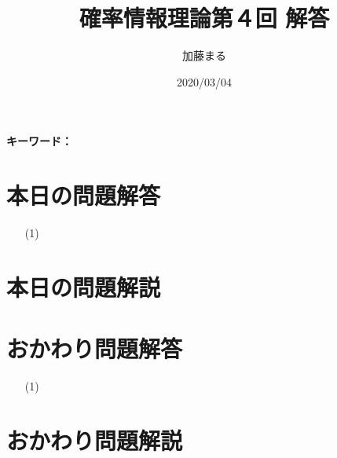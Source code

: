 \documentclass[a4j,uplatex]{jsarticle}
\title{確率情報理論第４回 解答}
\author{加藤まる}
\date{2020/03/04}
\begin{document}
\maketitle
\bf キーワード：

\section*{本日の問題解答}
\begin{itemize}
  \item[(1)]
\end{itemize}


\section*{本日の問題解説}

\section*{おかわり問題解答}
\begin{itemize}
  \item[(1)]
\end{itemize}

\section*{おかわり問題解説}
\end{document}
